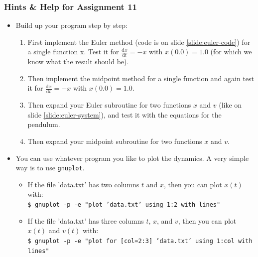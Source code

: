 \documentclass[11pt,aspectratio=169,handout]{beamer}
\newcommand{\dif}[3][]{\frac{\mathrm{d}^{#1}#3}{\mathrm{d}{#2}^{#1}}}
\begin{document}
\begin{frame}
\frametitle{Hints \& Help for Assignment 11}
\begin{itemize}
	\item Build up your program step by step:
	\pause
	\begin{enumerate}
		\item First implement the Euler method (code is on slide \ref{slide:euler-code}) for a single function x. Test it for $\dif{t}{x} = -x$ with $x(0.0) = 1.0$ (for which we know what the result should be).
		\pause
		\item Then implement the midpoint method for a single function and again test it for $\dif{t}{x} = -x$ with $x(0.0) = 1.0$.
		\pause
		\item Then expand your Euler subroutine for two functions $x$ and $v$ (like on slide \ref{slide:euler-system}), and test it with the equations for the pendulum.
		\pause
		\item Then expand your midpoint subroutine for two functions $x$ and $v$.
	\end{enumerate}
	\pause
	\item You can use whatever program you like to plot the dynamics. A very simple way is to use \texttt{gnuplot}.
	\begin{itemize}
		\pause
		\item If the file 'data.txt' has two columns $t$ and $x$, then you can plot $x(t)$ with:\\
		\texttt{\$ gnuplot -p -e "plot 'data.txt' using 1:2 with lines"}
		\pause
		\item If the file 'data.txt' has three columns $t$, $x$, and $v$, then you can plot $x(t)$ and $v(t)$ with:\\
		\texttt{\$ gnuplot -p -e "plot for [col=2:3] 'data.txt' using 1:col with lines"}
	\end{itemize} 
\end{itemize}

\end{frame}
\end{document}
